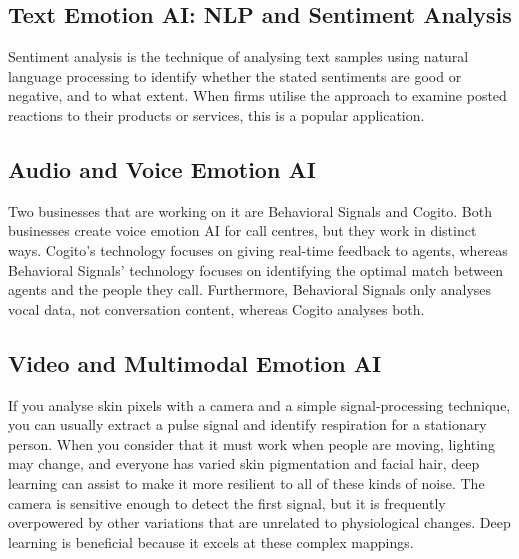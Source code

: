 \documentclass[12pt]{article}
\begin{document}
\subsection{Text Emotion AI: NLP and Sentiment Analysis}
Sentiment analysis is the technique of analysing text samples using natural language processing to identify whether the stated sentiments are good or negative, and to what extent. When firms utilise the approach to examine posted reactions to their products or services, this is a popular application.
\subsection{Audio and Voice Emotion AI}
Two businesses that are working on it are Behavioral Signals and Cogito. Both businesses create voice emotion AI for call centres, but they work in distinct ways. Cogito's technology focuses on giving real-time feedback to agents, whereas Behavioral Signals' technology focuses on identifying the optimal match between agents and the people they call. Furthermore, Behavioral Signals only analyses vocal data, not conversation content, whereas Cogito analyses both.
\subsection{Video and Multimodal Emotion AI}
If you analyse skin pixels with a camera and a simple signal-processing technique, you can usually extract a pulse signal and identify respiration for a stationary person. When you consider that it must work when people are moving, lighting may change, and everyone has varied skin pigmentation and facial hair, deep learning can assist to make it more resilient to all of these kinds of noise. The camera is sensitive enough to detect the first signal, but it is frequently overpowered by other variations that are unrelated to physiological changes. Deep learning is beneficial because it excels at these complex mappings.
\end{document}
